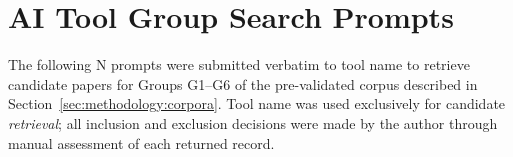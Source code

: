 \section{AI Tool Group Search Prompts}
\label{app:search_prompts}

The following N prompts were submitted verbatim to tool name to retrieve
candidate papers for Groups G1--G6 of the pre-validated corpus described in
Section~\ref{sec:methodology:corpora}. Tool name was used exclusively for
candidate \textit{retrieval}; all inclusion and exclusion decisions were made
by the author through manual assessment of each returned record.
